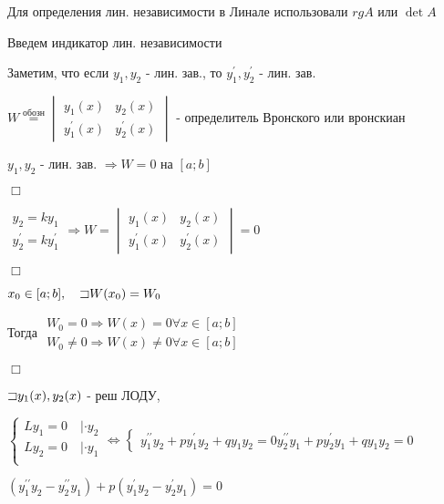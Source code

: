 \documentclass[12pt]{article}
\begin{document}
    \Mem Для определения лин. независимости в Линале использовали $rg A$ или $\det A$

    Введем индикатор лин. независимости

    Заметим, что если $\displaystyle y_1, y_2$ - лин. зав., то $\displaystyle y_1^\prime, y_2^\prime$ - лин. зав.

    \Def $\displaystyle W \stackrel{\text{обозн}}{=} \begin{vmatrix}y_1(x) & y_2(x) \\ y_1^\prime(x) & y_2^\prime(x)\end{vmatrix}$ - определитель Вронского или вронскиан

     $\displaystyle y_1, y_2$ - лин. зав. $\Longrightarrow W = 0$ на $[a;b]$

    $\Box$

    $\displaystyle \begin{matrix}y_2 = k y_1 \\ y_2^\prime = k y_1^\prime\end{matrix} \Longrightarrow W = \begin{vmatrix}y_1(x) & y_2(x) \\ y_1^\prime(x) & y_2^\prime(x)\end{vmatrix} = 0$

    $\Box$

     $\displaystyle x_0 \in [a;b], \quad \mathord{\sqsupset} W(x_0) = W_0$

    Тогда $\displaystyle \begin{matrix}W_0 = 0 \Longrightarrow W(x) = 0 \forall x \in [a;b] \\
    W_0 \neq 0 \Longrightarrow W(x) \neq 0 \forall x \in [a;b]\end{matrix}$

    $\Box$

    $\displaystyle \mathord{\sqsupset} y_1(x), y_2(x)$ - реш ЛОДУ,

    $\displaystyle \begin{cases}
        Ly_1 = 0 \quad | \cdot y_2 \\
        Ly_2 = 0 \quad | \cdot y_1 \\
    \end{cases} \Longleftrightarrow
    \begin{cases}
        y_1^{\prime\prime} y_2 + py_1^{\prime} y_2 + q y_1 y_2 = 0
        y_2^{\prime\prime} y_1 + py_2^{\prime} y_1 + q y_1 y_2 = 0
    \end{cases}$

    $\displaystyle (y_1^{\prime\prime} y_2 - y_2^{\prime\prime} y_1) + p (y_1^{\prime} y_2 - y_2^{\prime} y_1) = 0$
\end{document}
